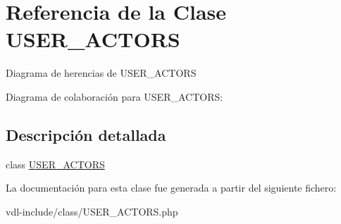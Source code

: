 \hypertarget{class_u_s_e_r___a_c_t_o_r_s}{\section{Referencia de la Clase U\-S\-E\-R\-\_\-\-A\-C\-T\-O\-R\-S}
\label{class_u_s_e_r___a_c_t_o_r_s}
}


Diagrama de herencias de U\-S\-E\-R\-\_\-\-A\-C\-T\-O\-R\-S


Diagrama de colaboración para U\-S\-E\-R\-\_\-\-A\-C\-T\-O\-R\-S\-:


\subsection{Descripción detallada}
class \hyperlink{class_u_s_e_r___a_c_t_o_r_s}{U\-S\-E\-R\-\_\-\-A\-C\-T\-O\-R\-S} 

La documentación para esta clase fue generada a partir del siguiente fichero\-:\begin{DoxyCompactItemize}
\item 
vdl-\/include/class/U\-S\-E\-R\-\_\-\-A\-C\-T\-O\-R\-S.\-php\end{DoxyCompactItemize}
